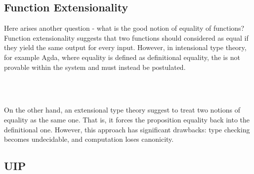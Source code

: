 \subsection*{Function Extensionality}

Here arises another question - what is the good notion of equality of functions? Function extensionality suggests that two functions should considered as equal if they yield the same output for every input. However, in intensional type theory, for example Agda, where equality is defined as definitional equality, the  is not provable within the system and must instead be postulated.

\begin{code}%
\>[0]\<%
\\
\>[0][@{}l@{\AgdaIndent{0}}]%
\>[2]\AgdaSpace{}%
\AgdaSymbol{:}%
\>[195I]\AgdaSymbol{\{}\AgdaSpace{}%
\AgdaSymbol{:}\AgdaSpace{}%
\AgdaSymbol{\}}\AgdaSpace{}%
\AgdaSymbol{\{}\AgdaSpace{}%
\AgdaSymbol{:}\AgdaSpace{}%
\AgdaSpace{}%
\AgdaSpace{}%
\AgdaSymbol{\}}\AgdaSpace{}%
\AgdaSymbol{\{}\AgdaSpace{}%
\AgdaSpace{}%
\AgdaSymbol{:}\AgdaSpace{}%
\AgdaSymbol{(}\AgdaSpace{}%
\AgdaSymbol{:}\AgdaSpace{}%
\AgdaSymbol{)}\AgdaSpace{}%
\AgdaSpace{}%
\AgdaSpace{}%
\AgdaSymbol{\}}\AgdaSpace{}%
\<%
\\
\>[.][@{}l@{}]\<[195I]%
\>[11]\AgdaSymbol{((}\AgdaSpace{}%
\AgdaSymbol{:}\AgdaSpace{}%
\AgdaSymbol{)}\AgdaSpace{}%
\AgdaSpace{}%
\AgdaSpace{}%
\AgdaSpace{}%
\AgdaSpace{}%
\AgdaSpace{}%
\AgdaSymbol{)}\AgdaSpace{}%
\AgdaSpace{}%
\AgdaSpace{}%
\AgdaSpace{}%
\<%
\end{code}

On the other hand, an extensional type theory suggest to treat two notions of equality as the same one. That is, it forces the proposition equality back into the definitional one. However, this approach has significant drawbacks: type checking becomes undecidable, and computation loses canonicity.

\subsection*{UIP}

